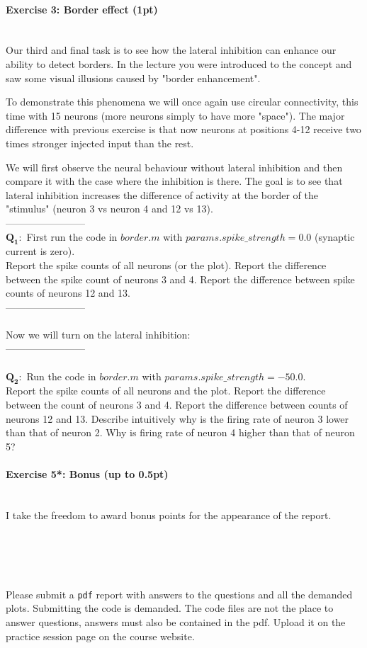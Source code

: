\documentclass[a4paper,11pt]{article}
\newenvironment{exercise}[3]{\paragraph{Exercise #1: #2 (#3pt)}\ \\}{
\medskip}
\newcommand{\question}[2]{\setlength\parindent{10mm}\ \\$\mathbf{Q_#1:}$ #2\ \\}
\begin{document}
%
%
\begin{exercise}{3}{Border effect}{1}
Our third and final task is to see how the lateral inhibition can enhance our ability to detect borders. In the lecture you were introduced to the concept and saw some visual illusions caused by "border enhancement".

To demonstrate this phenomena we will once again use circular connectivity, this time with 15 neurons (more neurons simply to have more "space"). The major difference with previous exercise is that now neurons at positions 4-12 receive two times stronger injected input than the rest.

We will first observe the neural behaviour without lateral inhibition and then compare it with the case where the inhibition is there. The goal is to see that lateral inhibition increases the difference of activity at the border of the "stimulus" (neuron 3 vs neuron 4 and 12 vs 13).\\
------------------------
\question{1}{First run the code in $border.m$ with $params.spike\_strength = 0.0$ (synaptic current is zero).\\ Report the spike counts of all neurons (or the plot). Report the difference between the spike count of neurons 3 and 4. Report the difference between spike counts of neurons 12 and 13.}
------------------------\\
\ \\
Now we will turn on the lateral inhibition:\\
------------------------\\
\question{2}{Run the code in $border.m$ with $params.spike\_strength = -50.0$.\\
Report the spike counts of all neurons and the plot. Report the difference between the count of neurons 3 and 4. Report the difference between counts of neurons 12 and 13. Describe intuitively why is the firing rate of neuron 3 lower than that of neuron 2. Why is firing rate of neuron 4 higher than that of neuron 5?}
\end{exercise}



\begin{exercise}{5*}{Bonus}{up to 0.5}
I take the freedom to award bonus points for the appearance of the report.
\end{exercise}


\ \\
\ \\
\ \\
\ \\

Please submit a \texttt{pdf} report with answers to the questions and all the demanded plots. Submitting the code is demanded. The code files are not the place to answer questions, answers must also be contained in the pdf. Upload it on the practice session page on the course website.
\end{document}
